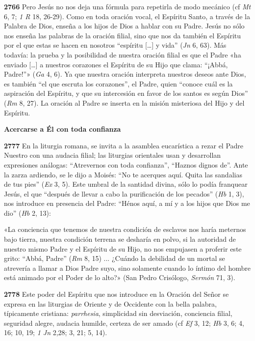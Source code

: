 \documentclass[]{article}
\begin{document}
\textbf{2766} Pero Jesús no nos deja una fórmula para repetirla de modo
mecánico (cf \emph{Mt} 6, 7; \emph{1 R} 18, 26-29). Como en toda oración
vocal, el Espíritu Santo, a través de la Palabra de Dios, enseña a los
hijos de Dios a hablar con su Padre. Jesús no sólo nos enseña las
palabras de la oración filial, sino que nos da también el Espíritu por
el que estas se hacen en nosotros ``espíritu [\ldots{}] y vida''
(\emph{Jn} 6, 63). Más todavía: la prueba y la posibilidad de nuestra
oración filial es que el Padre «ha enviado [\ldots{}] a nuestros
corazones el Espíritu de su Hijo que clama: ``¡Abbá, Padre!''»
(\emph{Ga} 4, 6). Ya que nuestra oración interpreta nuestros deseos ante
Dios, es también ``el que escruta los corazones'', el Padre, quien
``conoce cuál es la aspiración del Espíritu, y que su intercesión en
favor de los santos es según Dios'' (\emph{Rm} 8, 27). La oración al
Padre se inserta en la misión misteriosa del Hijo y del Espíritu.

\textbf{Acercarse a Él con toda confianza}

\textbf{2777} En la liturgia romana, se invita a la asamblea eucarística
a rezar el Padre Nuestro con una audacia filial; las liturgias
orientales usan y desarrollan expresiones análogas: ``Atrevernos con
toda confianza'', ``Haznos dignos de''. Ante la zarza ardiendo, se le
dijo a Moisés: ``No te acerques aquí. Quita las sandalias de tus pies''
(\emph{Ex} 3, 5). Este umbral de la santidad divina, sólo lo podía
franquear Jesús, el que ``después de llevar a cabo la purificación de
los pecados'' (\emph{Hb} 1, 3), nos introduce en presencia del Padre:
``Hénos aquí, a mí y a los hijos que Dios me dio'' (\emph{Hb} 2, 13):

«La conciencia que tenemos de nuestra condición de esclavos nos haría
meternos bajo tierra, nuestra condición terrena se desharía en polvo, si
la autoridad de nuestro mismo Padre y el Espíritu de su Hijo, no nos
empujasen a proferir este grito: ``Abbá, Padre'' (\emph{Rm} 8, 15) ...
¿Cuándo la debilidad de un mortal se atrevería a llamar a Dios Padre
suyo, sino solamente cuando lo íntimo del hombre está animado por el
Poder de lo alto?» (San Pedro Crisólogo, \emph{Sermón} 71, 3).

\textbf{2778} Este poder del Espíritu que nos introduce en la Oración
del Señor se expresa en las liturgias de Oriente y de Occidente con la
bella palabra, típicamente cristiana: \emph{parrhesia}, simplicidad sin
desviación, conciencia filial, seguridad alegre, audacia humilde,
certeza de ser amado (cf \emph{Ef} 3, 12; \emph{Hb} 3, 6; 4, 16; 10, 19;
\emph{1 Jn} 2,28; 3, 21; 5, 14).
\end{document}
